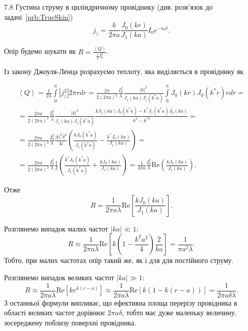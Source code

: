\begin{Solution}{7.{8}}
Густина струму в циліндричному провіднику (див. розв'язок до задачі~\ref{prb:TrueSkin})
\[
	j_z = \frac{k}{2\pi a} \frac{J_0(kr)}{J_1(ka)} I_0e^{-i\omega t}.
\]

Опір будемо шукати як $R = \frac{\left\langle Q \right\rangle }{\frac12I_0^2}$.


Із закону Джоуля-Ленца розрахуємо теплоту, яка виділяється в провіднику як%

\begin{multline*}
    \left\langle Q \right\rangle = \frac1{2\lambda}\int\limits_0^a \left| j_z^2\right| 2\pi r dr = \frac{2\pi}{2(2\pi a)^2} \frac{I_0^2}{\lambda} \frac{|k|^2}{J_1(ka)J_1(k^*a)}  \int\limits_0^a  J_0(kr)J_0(k^*r) r dr = \\
    = \frac{2\pi a}{2(2\pi a)^2} \frac{I_0^2}{\lambda} \frac{|k|^2}{J_1(ka)J_1(k^*a)} \frac{kJ_1(ka)J_0(k^*a) - k^*J_1(k^*a)J_0(ka)}{k^2-k^{*2}} =\\
    = \frac{2\pi a }{2(2\pi a)^2} \frac{I_0^2}{\lambda} \frac{|k|^2\delta^2}{4i}\left( \frac{kJ_0(k^*a)}{J_1(k^*a)} - \frac{k^*J_0(ka)}{J_1(ka)}\right) = \\ = \frac{2\pi a}{2(2\pi a)^2} \frac{I_0^2}{\lambda} \frac12  \left( \frac{k^*J_0(k^*a)}{J_1(k^*a)} + \frac{kJ_0(ka)}{J_1(ka)}\right) =  \frac{1}{4\pi a} \frac{I_0^2}{\lambda}  \mathrm{Re}\left(  \frac{kJ_0(ka)}{J_1(ka)} \right).
\end{multline*}

Отже
\[
    R = \frac{1}{2\pi a\lambda}  \mathrm{Re}\left[  \frac{kJ_0(ka)}{J_1(ka)} \right].
\]

Розглянемо випадок малих частот $|ka| \ll 1$:
\[
    R \approx \frac{1}{2\pi a\lambda}  \mathrm{Re} \left[k\left( 1 - \frac{k^2a^2}{4}\right)\frac{2}{ka}  \right] = \frac{1}{\pi a^2 \lambda}.
\]
Тобто, при малих частотах опір такий же, як і для для постійного струму.

Розглянемо випадок великих частот $|ka| \gg 1$:
\[
    R \approx \frac{1}{2\pi a\lambda} \mathrm{Re}\left[  ke^{k(r-a)} \right] \approx \frac{1}{2\pi a\lambda} \mathrm{Re}\left[  k(1-k(r-a)) \right] =  \frac{1}{2\pi a\delta\lambda}.
\]
З останньої формули випливає, що ефективна площа перерізу провідника в області великих частот дорівнює $2\pi a\delta$, тобто має дуже маленьку величину, зосереджену поблизу поверхні провідника.
\end{Solution}
